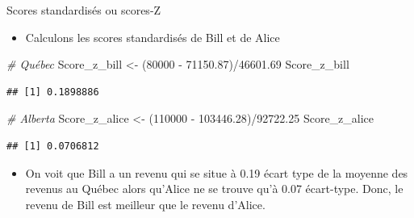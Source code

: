 \documentclass[
  ignorenonframetext,
]{beamer}
\newenvironment{Shaded}{\begin{snugshade}}{\end{snugshade}}
\newcommand{\CommentTok}[1]{\textcolor[rgb]{0.56,0.35,0.01}{\textit{#1}}}
\newcommand{\DecValTok}[1]{\textcolor[rgb]{0.00,0.00,0.81}{#1}}
\newcommand{\FloatTok}[1]{\textcolor[rgb]{0.00,0.00,0.81}{#1}}
\newcommand{\NormalTok}[1]{#1}
\newcommand{\OtherTok}[1]{\textcolor[rgb]{0.56,0.35,0.01}{#1}}
\newcommand{\SpecialCharTok}[1]{\textcolor[rgb]{0.00,0.00,0.00}{#1}}
\providecommand{\tightlist}{%
  \setlength{\itemsep}{0pt}\setlength{\parskip}{0pt}}
\begin{document}
\begin{frame}[fragile]{Scores standardisés ou scores-Z}
\protect\hypertarget{scores-standardisuxe9s-ou-scores-z-2}{}
\begin{itemize}
\tightlist
\item
  Calculons les scores standardisés de Bill et de Alice
\end{itemize}

\begin{Shaded}
\begin{Highlighting}[]
\CommentTok{\# Québec}
\NormalTok{Score\_z\_bill }\OtherTok{\textless{}{-}}\NormalTok{ (}\DecValTok{80000} \SpecialCharTok{{-}} \FloatTok{71150.87}\NormalTok{)}\SpecialCharTok{/}\FloatTok{46601.69}
\NormalTok{Score\_z\_bill}
\end{Highlighting}
\end{Shaded}

\begin{verbatim}
## [1] 0.1898886
\end{verbatim}

\begin{Shaded}
\begin{Highlighting}[]
\CommentTok{\# Alberta}
\NormalTok{Score\_z\_alice }\OtherTok{\textless{}{-}}\NormalTok{ (}\DecValTok{110000} \SpecialCharTok{{-}} \FloatTok{103446.28}\NormalTok{)}\SpecialCharTok{/}\FloatTok{92722.25}
\NormalTok{Score\_z\_alice}
\end{Highlighting}
\end{Shaded}

\begin{verbatim}
## [1] 0.0706812
\end{verbatim}

\begin{itemize}
\tightlist
\item
  On voit que Bill a un revenu qui se situe à 0.19 écart type de la
  moyenne des revenus au Québec alors qu'Alice ne se trouve qu'à 0.07
  écart-type. Donc, le revenu de Bill est meilleur que le revenu
  d'Alice.
\end{itemize}
\end{frame}
\end{document}
